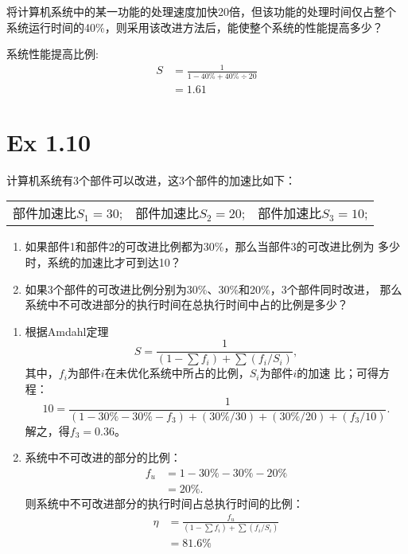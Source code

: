 将计算机系统中的某一功能的处理速度加快20倍，但该功能的处理时间仅占整个
系统运行时间的40\%，则采用该改进方法后，能使整个系统的性能提高多少？

\begin{solve}
  系统性能提高比例:
  \begin{align*}
    S &= \frac{1}{1 - 40\% + 40\% \div 20} \\
      &= 1.61
  \end{align*}
\end{solve}

\section{Ex 1.10}

计算机系统有3个部件可以改进，这3个部件的加速比如下：

\begin{tabular*}{1.0\linewidth}{ccc}
  部件加速比$S_1 = 30$; & 部件加速比$S_2 = 20$; & 部件加速比$S_3=10$;
\end{tabular*}

\begin{enumerate}
\item 如果部件1和部件2的可改进比例都为30\%，那么当部件3的可改进比例为
  多少时，系统的加速比才可到达10？
\item 如果3个部件的可改进比例分别为30\%、30\%和20\%，3个部件同时改进，
  那么系统中不可改进部分的执行时间在总执行时间中占的比例是多少？
\end{enumerate}

\begin{solve}
  \begin{enumerate}
  \item 根据Amdahl定理
    \begin{equation}
      S = \frac{1}{(1-\sum{f_i}) + \sum{(f_i/S_i)}},
    \end{equation}
    其中，$f_i$为部件$i$在未优化系统中所占的比例，$S_i$为部件$i$的加速
    比；可得方程：
    \begin{equation}
      10 = \frac{1}{(1-30\%-30\%-f_3) + (30\%/30) + (30\%/20) + (f_3 / 10) }.
    \end{equation}
    解之，得$f_3 = 0.36$。
  \item 系统中不可改进的部分的比例：
    \begin{align*}
      f_u &= 1-30\%-30\%-20\%\\ &= 20\%.
    \end{align*}
    则系统中不可改进部分的执行时间占总执行时间的比例：
    \begin{align*}
      \eta &= \frac{f_u}{(1-\sum{f_i}) + \sum{(f_i/S_i)}}\\
      &= 81.6\%
    \end{align*}
  \end{enumerate}
\end{solve}

